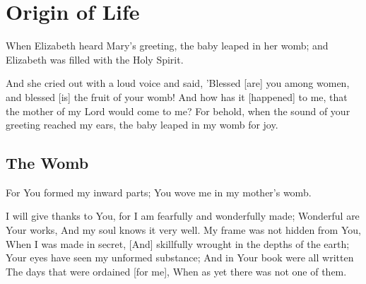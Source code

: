 \chapter{Origin of Life}

\begin{scripture}[Luke 1:41-44]
     
    When Elizabeth heard Mary's greeting, the baby leaped in her womb; and Elizabeth was filled with the Holy Spirit.    
    \begin{poetry}
        And she cried out with a loud voice and said, 'Blessed [are] you among women, and blessed [is] the fruit of your womb!
        And how has it [happened] to me, that the mother of my Lord would come to me?
        For behold, when the sound of your greeting reached my ears, the baby leaped in my womb for joy.
 
    \end{poetry}
\end{scripture}

\vspace{2\baselineskip}

\section{The Womb}

\begin{scripture}[Psalm 139:13-16]

        
        For You formed my inward parts; You wove me in my mother's womb.  
        \begin{poetry}
       I will give thanks to You, for I am fearfully and wonderfully made; Wonderful are Your works, And my soul knows it very well.  
        My frame was not hidden from You, When I was made in secret, [And] skillfully wrought in the depths of the earth;  
        Your eyes have seen my unformed substance; And in Your book were all written The days that were ordained [for me], When as yet there was not one of them.  
        \end{poetry}
\end{scripture}

\vspace{1\baselineskip}


